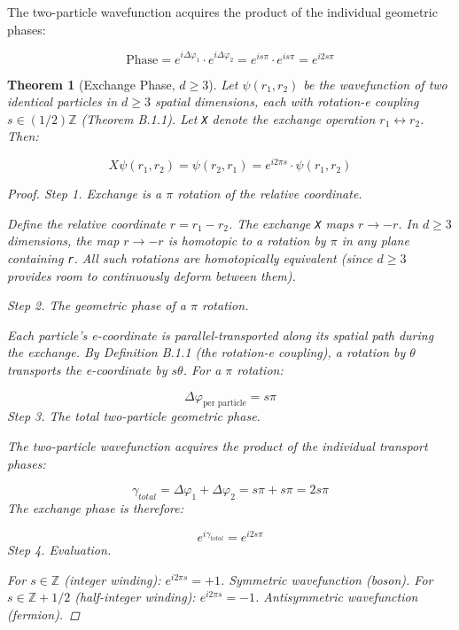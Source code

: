 \documentclass[aps,prd,preprint,superscriptaddress,longbibliography,floatfix]{revtex4-2}
\newtheorem{theorem}{Theorem}[section]
\theoremstyle{remark}
\begin{document}
The two-particle wavefunction acquires the product of the individual geometric phases:


\begin{equation}
    \text{Phase} = e^{i\Delta\varphi_{1}} \cdot e^{i\Delta\varphi_{2}} = e^{is\pi} \cdot e^{is\pi} = e^{i2s\pi}
\end{equation}
\begin{theorem}[Exchange Phase, $d \geq 3$]
\label{thm:B21} \textit{Let $\psi(r_{1}, r_{2})$ be the wavefunction of two identical particles in $d \geq 3$ spatial dimensions, each with rotation-e coupling $s \in (1/2)\mathbb{Z}$ (Theorem B.1.1). Let \texttt{X} denote the exchange operation $r_{1} \leftrightarrow r_{2}$. Then:}


\begin{equation}
    X \psi(r_{1}, r_{2}) = \psi(r_{2}, r_{1}) = e^{i2\pi s} \cdot \psi(r_{1}, r_{2})
\end{equation}
\begin{proof}

\textit{Step 1. Exchange is a $\pi$ rotation of the relative coordinate.}

Define the relative coordinate $r = r_{1} - r_{2}$. The exchange \texttt{X} maps $r \to -r$. In $d \geq 3$ dimensions, the map $r \to -r$ is homotopic to a rotation by $\pi$ in any plane containing \texttt{r}. All such rotations are homotopically equivalent (since $d \geq 3$ provides room to continuously deform between them).

\textit{Step 2. The geometric phase of a $\pi$ rotation.}

Each particle's e-coordinate is parallel-transported along its spatial path during the exchange. By Definition B.1.1 (the rotation-e coupling), a rotation by $\theta$ transports the e-coordinate by $s\theta$. For a $\pi$ rotation:


\begin{equation}
    \Delta\varphi_{\text{per particle}} = s\pi
\end{equation}
\textit{Step 3. The total two-particle geometric phase.}

The two-particle wavefunction acquires the product of the individual transport phases:


\begin{equation}
    \gamma_{total} = \Delta\varphi_{1} + \Delta\varphi_{2} = s\pi + s\pi = 2s\pi
\end{equation}
The exchange phase is therefore:


\begin{equation}
    e^{i\gamma_{total}} = e^{i2s\pi}
\end{equation}
\textit{Step 4. Evaluation.}

For $s \in \mathbb{Z}$ (integer winding): $e^{i2\pi s} = +1$. Symmetric wavefunction (boson). For $s \in \mathbb{Z} + 1/2$ (half-integer winding): $e^{i2\pi s} = -1$. Antisymmetric wavefunction (fermion). \end{proof}
\end{theorem}
\end{document}
